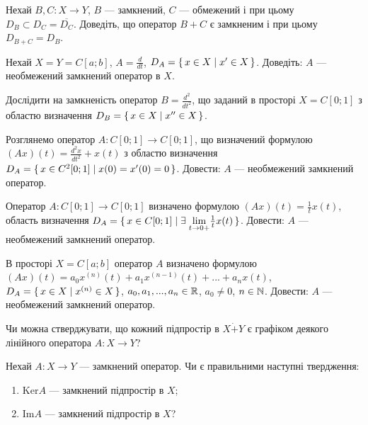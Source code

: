 \begin{exercise}
    Нехай $B, C : X \to Y$, $B$ --- замкнений, $C$ --- обмежений і при цьому $D_B \subset D_C = \overline{D_C}$.
    Доведіть, що оператор $B + C$ є замкненим і при цьому $D_{B+C} = D_B$.
\end{exercise}

\begin{exercise}
    Нехай $X = Y = C[a; b]$, $A = \frac{d}{dt}$, $D_A = \set{x \in X \mid x^\prime \in X}$.
    Доведіть: $A$ --- необмежений замкнений оператор в $X$.
\end{exercise}

\begin{exercise}
    Дослідити на замкненість оператор $B = \frac{d^2}{d t^2}$, що заданий в просторі $X = C[0;1]$
    з областю визначення $D_B = \set{x \in X \mid x^{\prime\prime} \in X}$.
\end{exercise}

\begin{exercise}
    Розглянемо оператор $A : C[0;1] \to C[0;1]$, що визначений формулою $(Ax)(t) = \frac{d^2x }{d t^2} + x(t)$
    з областю визначення $D_A = \set{x \in C^2 [0;1] \mid x(0) = x^\prime(0) = 0}$.
    Довести: $A$ --- необмежений замкнений оператор.
\end{exercise}

\begin{exercise}
    Оператор $A : C[0;1] \to C[0;1]$ визначено формулою $(Ax)(t) = \frac{1}{t} x(t)$,
    область визначення $D_A = \set{x \in C[0;1] \mid \exists \; \underset{t \to 0+}{\lim} \frac{1}{t} x(t)}$.
    Довести: $A$ --- необмежений замкнений оператор.
\end{exercise}

\begin{exercise*}
    В просторі $X = C[a;b]$ оператор $A$ визначено формулою $(Ax)(t) = a_0 x^{(n)}(t) + a_1 x^{(n-1)}(t) + ... + a_n x(t)$, 
    $D_A = \set{x \in X \mid x^{(n)} \in X}$, $a_0, a_1, ..., a_n \in \mathbb{R}$, $a_0 \neq 0$, $n \in \mathbb{N}$.
    Довести: $A$ --- необмежений замкнений оператор.
\end{exercise*}

\begin{exercise}
    Чи можна стверджувати, що кожний підпростір в $X \dot{+} Y$ є графіком деякого лінійного оператора $A : X \to Y$?
\end{exercise}

\begin{exercise}
    Нехай $A : X \to Y$ --- замкнений оператор. Чи є правильними наступні твердження:
    \begin{enumerate}
        \item $\mathrm{Ker} A$ --- замкнений підпростір в $X$;
        \item $\mathrm{Im} A$ --- замкнений підпростір в $X$?
    \end{enumerate}
\end{exercise}

